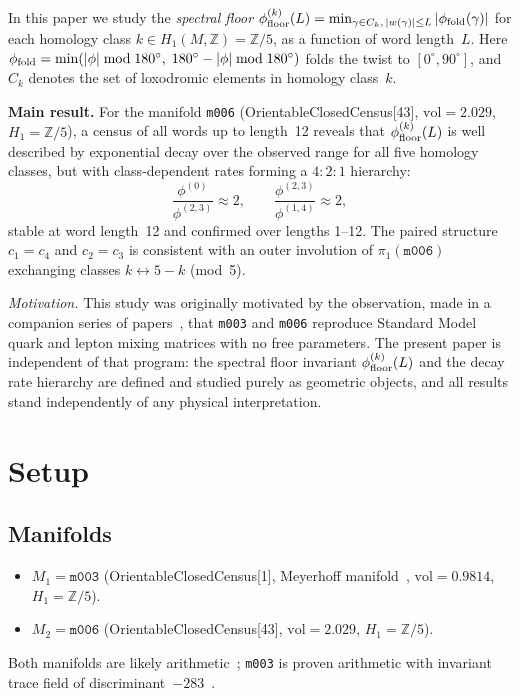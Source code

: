 \documentclass[12pt,a4paper]{article}
\newcommand{\mfld}[1]{\texttt{#1}}
\newcommand{\degr}{^{\circ}}
\begin{document}
In this paper we study the \emph{spectral floor}
$\phi_{\rm floor}^{(k)}(L)=\min_{\gamma\in C_k,\,|w(\gamma)|\leq L}
|\phi_{\rm fold}(\gamma)|$
for each homology class $k\in H_1(M,\mathbb{Z})=\mathbb{Z}/5$,
as a function of word length~$L$.
Here $\phi_{\rm fold}=\min(|\phi|\bmod 180\degr,\;180\degr-|\phi|\bmod 180\degr)$
folds the twist to $[0\degr,90\degr]$, and $C_k$ denotes the set of
loxodromic elements in homology class~$k$.

\textbf{Main result.}
For the manifold \mfld{m006} (OrientableClosedCensus[43], $\mathrm{vol}=2.029$,
$H_1=\mathbb{Z}/5$), a census of all words up to length~12 reveals that
$\phi_{\rm floor}^{(k)}(L)$ is well described by exponential decay over the observed range for all five
homology classes, but with class-dependent rates forming a $4:2:1$ hierarchy:
\begin{equation}
  \frac{\phi^{(0)}}{\phi^{(2,3)}} \approx 2,\qquad
  \frac{\phi^{(2,3)}}{\phi^{(1,4)}} \approx 2,
  \label{eq:ratio}
\end{equation}
stable at word length~12 and confirmed over lengths 1--12.
The paired structure $c_1=c_4$ and $c_2=c_3$ is consistent with an
outer involution of $\pi_1(\mfld{m006})$ exchanging classes
$k\leftrightarrow 5-k$ (mod~5).

\textit{Motivation.}
This study was originally motivated by the observation, made in a
companion series of papers~\cite{GentryCKM,GentryPMNS,GentryTwist},
that \mfld{m003} and \mfld{m006} reproduce Standard Model quark and
lepton mixing matrices with no free parameters.
The present paper is independent of that program: the spectral floor
invariant $\phi_{\rm floor}^{(k)}(L)$ and the decay rate hierarchy are
defined and studied purely as geometric objects, and all results stand
independently of any physical interpretation.

\section{Setup}
\label{sec:setup}

\subsection{Manifolds}
\begin{itemize}
\item $M_1=\mfld{m003}$ (OrientableClosedCensus[1], Meyerhoff manifold~\cite{Meyerhoff87},
      $\mathrm{vol}=0.9814$, $H_1=\mathbb{Z}/5$).
\item $M_2=\mfld{m006}$ (OrientableClosedCensus[43], $\mathrm{vol}=2.029$,
      $H_1=\mathbb{Z}/5$).
\end{itemize}
Both manifolds are likely arithmetic~\cite{MaclachlanReid,Chinburg98};
\mfld{m003} is proven arithmetic with invariant trace field of
discriminant~$-283$~\cite{Chinburg98}.
\end{document}
